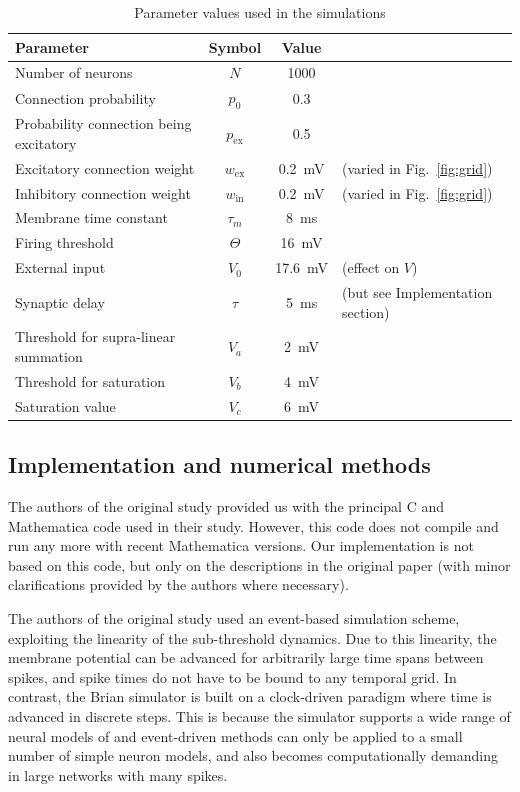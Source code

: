 \documentclass[10pt,a4paper,onecolumn]{article}
\begin{document}
\begin{table}[ht]
\begin{tabular}{ l  c  S p{2.85cm}}
  \toprule
  {Parameter} & {Symbol} & {Value} &\\
  \midrule
  Number of neurons & $N$ & 1000 &\\
  Connection probability & $p_0$ & 0.3 &\\
  Probability connection being excitatory & $p_\text{ex}$ & 0.5 &\\
  Excitatory connection weight & $w_\text{ex}$ & \SI{0.2}{\milli\volt} & (varied in Fig.~\ref{fig:grid})\\
  Inhibitory connection weight & $w_\text{in}$ & \SI{0.2}{\milli\volt} & (varied in Fig.~\ref{fig:grid})\\
  Membrane time constant & $ \tau_m $ & \SI{8}{\milli\second} &\\
  Firing threshold & $\Theta$ & \SI{16}{\milli\volt} &\\
  External input & $V_0$ & \SI{17.6}{\milli\volt}&(effect on $V$)\\
  Synaptic delay & $\tau$ & \SI{5}{\milli\second} & (but see Implementation section)\\
  Threshold for supra-linear summation & $V_a$ & \SI{2}{\milli\volt} \\
  Threshold for saturation & $V_b$ & \SI{4}{\milli\volt} \\
  Saturation value & $V_c$ & \SI{6}{\milli\volt} \\
  \bottomrule
\end{tabular}
\caption{Parameter values used in the simulations}\label{tab:parameters}
\end{table}

\subsection*{Implementation and numerical methods}
The authors of the original study provided us with the principal C and Mathematica code used in their study. However, this code does not compile and run any more with recent Mathematica versions. Our implementation is not based on this code, but only on the descriptions in the original paper (with minor clarifications provided by the authors where necessary).

The authors of the original study used an event-based simulation scheme, exploiting the linearity of the sub-threshold dynamics. Due to this linearity, the membrane potential can be advanced for arbitrarily large time spans between spikes, and spike times do not have to be bound to any temporal grid. In contrast, the Brian simulator is built on a clock-driven paradigm where time is advanced in discrete steps. This is because the simulator supports a wide range of neural models of and event-driven methods can only be applied to a small number of simple neuron models, and also becomes computationally demanding in large networks with many spikes.
\end{document}
